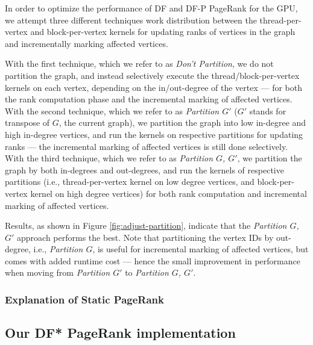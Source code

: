 In order to optimize the performance of DF and DF-P PageRank for the GPU, we attempt three different techniques work distribution between the thread-per-vertex and block-per-vertex kernels for updating ranks of vertices in the graph and incrementally marking affected vertices.

With the first technique, which we refer to as \textit{Don't Partition}, we do not partition the graph, and instead selectively execute the thread/block-per-vertex kernels on each vertex, depending on the in/out-degree of the vertex --- for both the rank computation phase and the incremental marking of affected vertices. With the second technique, which we refer to as \textit{Partition $G'$} ($G'$ stands for transpose of $G$, the current graph), we partition the graph into low in-degree and high in-degree vertices, and run the kernels on respective partitions for updating ranks --- the incremental marking of affected vertices is still done selectively. With the third technique, which we refer to as \textit{Partition $G$, $G'$}, we partition the graph by both in-degrees and out-degrees, and run the kernels of respective partitions (i.e., thread-per-vertex kernel on low degree vertices, and block-per-vertex kernel on high degree vertices) for both rank computation and incremental marking of affected vertices.

Results, as shown in Figure \ref{fig:adjust-partition}, indicate that the \textit{Partition $G$, $G'$} approach performs the best. Note that partitioning the vertex IDs by out-degree, i.e., \textit{Partition $G$}, is useful for incremental marking of affected vertices, but comes with added runtime cost --- hence the small improvement in performance when moving from \textit{Partition $G'$} to \textit{Partition $G$, $G'$}.










\subsubsection{Explanation of Static PageRank}
\label{sec:static-impl}


\subsection{Our DF* PageRank implementation}

